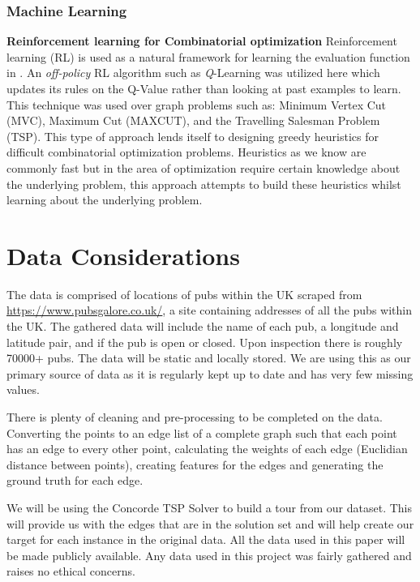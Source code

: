 \documentclass[]{UCD_CS_FYP_Report}
\begin{document}
\subsection{Machine Learning}
\textbf{Reinforcement learning for Combinatorial optimization}
Reinforcement learning (RL) is used as a natural framework for learning the evaluation function in \cite{DBLP:journals/corr/DaiKZDS17}. An \textit{off-policy} RL algorithm such as \textit{Q}-Learning was utilized here which updates its rules on the Q-Value rather than looking at past examples to learn. This technique was used over graph problems such as: Minimum Vertex Cut (MVC), Maximum Cut (MAXCUT), and the Travelling Salesman Problem (TSP). This type of approach lends itself to designing greedy heuristics for difficult combinatorial optimization problems. Heuristics as we know are commonly fast but in the area of optimization require certain knowledge about the underlying problem, this approach attempts to build these heuristics whilst learning about the underlying problem.





\chapter{Data Considerations}
The data is comprised of locations of pubs within the UK scraped from \url{https://www.pubsgalore.co.uk/}, a site containing addresses of all the pubs within the UK. The gathered data will include the name of each pub, a longitude and latitude pair, and if the pub is open or closed.  Upon inspection there is roughly 70000+ pubs. The data will be static and locally stored. We are using this as our primary source of data as it is regularly kept up to date and has very few missing values.

There is plenty of cleaning and pre-processing to be completed on the data. Converting the points to an edge list of a complete graph such that each point has an edge to every other point, calculating the weights of each edge (Euclidian distance between points), creating features for the edges and generating the ground truth for each edge.

We will be using the Concorde TSP Solver \cite{davidapplegate2007} to build a tour from our dataset. This will provide us with the edges that are in the solution set and will help create our target for each instance in the original data.
All the data used in this paper will be made publicly available. Any data used in this project was fairly gathered and raises no ethical concerns.
\end{document}
